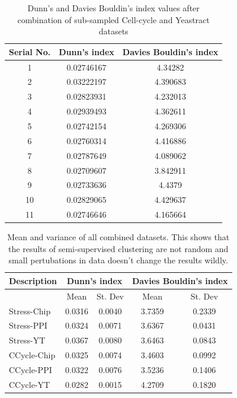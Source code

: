 \begin{table}[p]
\centering
\begin{tabular}{|c|c|c|}
\hline
Serial No. & Dunn’s index  & Davies Bouldin’s index\\
\hline
1 & 0.02746167 & 4.34282 \\
2 & 0.03222197 & 4.390683 \\
3 & 0.02823931 &  4.232013 \\
4 & 0.02939493 &  4.362611 \\
5 & 0.02742154 & 4.269306 \\
6 & 0.02760314 & 4.416886 \\
7 & 0.02787649 & 4.089062 \\
8 & 0.02709607 & 3.842911 \\
9 & 0.02733636 & 4.4379 \\
10 & 0.02829065 & 4.429637 \\
11 & 0.02746646 &  4.165664 \\
\hline 
\end{tabular}
\caption{Dunn's and Davies Bouldin's index values after combination of sub-sampled Cell-cycle and Yeastract datasets}
\label{tab:ccycle_yt_perturbed}
\end{table}

\begin{table}
\centering
\begin{tabular}{|l|c|c|c|c|}
\hline
Description & \multicolumn{2}{|c|}{Dunn’s index}  & \multicolumn{2}{|c|}{Davies Bouldin’s index}\\
\hline
 & Mean & St. Dev & Mean & St. Dev\\
\hline
Stress-Chip & 0.0316 & 0.0040 & 3.7359 & 0.2339 \\
Stress-PPI & 0.0324 & 0.0071 & 3.6367 & 0.0431 \\
Stress-YT & 0.0367 & 0.0080 & 3.6463 & 0.0843 \\

\hline
CCycle-Chip & 0.0325 & 0.0074 & 3.4603 & 0.0992 \\
CCycle-PPI & 0.0322 & 0.0076 & 3.5236 & 0.1406 \\
CCycle-YT & 0.0282 & 0.0015 & 4.2709 & 0.1820 \\
\hline 
\end{tabular}
\caption{Mean and variance of all combined datasets. This shows that the results of semi-supervised clustering are not random and small pertubations in data doesn’t change the results wildly.}
\label{tab:mean_stdev_combined_perturbed}
\end{table}

